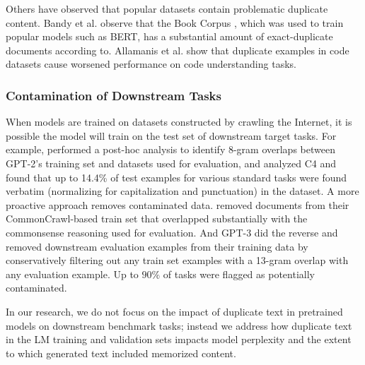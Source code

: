 Others have observed that popular datasets contain problematic duplicate content.
Bandy et al. \citep{bandy2021addressing} observe that the  Book Corpus \citep{zhu2015aligning}, which was used to train popular models such as BERT, has a substantial amount of exact-duplicate documents according to.
Allamanis et al. \citet{allamanis2019adverse} show that duplicate examples in code datasets cause worsened performance on code understanding tasks.

\subsubsection{Contamination of Downstream Tasks}
When models are trained on datasets constructed by crawling the Internet, it is possible the model will train on the test set of downstream target tasks.
For example, \citet[\S{}4]{radford2019language} performed a post-hoc analysis to identify 8-gram overlaps between GPT-2's training set and datasets used for evaluation,
and \citet{Dodge2021-lb} analyzed C4 and found that up to 14.4\%  of test examples for various standard tasks were found verbatim (normalizing for capitalization and punctuation) in the dataset.
A more proactive approach removes contaminated data.
\citet[Appendix B]{trinh2018simple} removed documents from their CommonCrawl-based train set that overlapped substantially with the commonsense reasoning used for evaluation.
And GPT-3 \cite[\S{}5]{brown2020language} did the reverse and removed downstream evaluation examples from their training data by conservatively filtering out any train set examples with a 13-gram overlap with any evaluation example.
Up to $90\%$ of tasks were flagged as potentially contaminated.

In our research, we do not focus on the impact of duplicate text in pretrained models on downstream benchmark tasks; instead we address how duplicate text in the LM training and validation sets impacts model perplexity and the extent to which generated text included memorized content.


